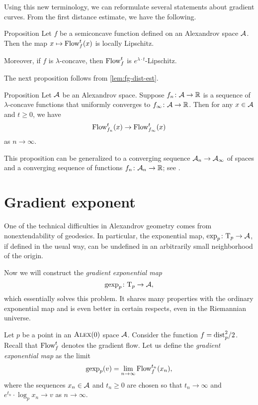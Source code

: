 Using this new terminology, we can reformulate several statements about gradient curves.
From the first distance estimate, we have the following.

\begin{thm}{Proposition}\label{prop:GF-is-lip}
Let $f$ be a semiconcave function defined on an Alexandrov space $\mathcal{A}$.
Then the map $x\mapsto\mathop{\rm Flow}\nolimits^t_f(x)$ is locally Lipschitz.

Moreover, if $f$ is $\lambda$-concave, then $\mathop{\rm Flow}\nolimits^t_f$ is $e^{\lambda\cdot t}$-Lipschitz.
\end{thm}

The next proposition follows from \ref{lem:fg-dist-est}.

\begin{thm}{Proposition}\label{grad-curve-conv}
Let $\mathcal{A}$ be an Alexandrov space.
Suppose $f_n\colon\mathcal{A}\to\mathbb{R}$ is a sequence of
$\lambda$-concave functions 
that uniformly converges to $f_\infty\colon\mathcal{A}\to \mathbb{R}$. 
Then for any $x\in \mathcal{A}$ and $t\ge 0$, we have
\[\mathop{\rm Flow}\nolimits_{f_n}^t(x)\to \mathop{\rm Flow}\nolimits_{f_\infty}^t(x)\]
as $n\to \infty$.
\end{thm}

This proposition can be generalized to a converging sequence $\mathcal{A}_n\to \mathcal{A}_\infty$ of spaces and a converging sequence of functions $f_n\colon\mathcal{A}_n\to\mathbb{R}$; see \cite[16.21]{alexander-kapovitch-petrunin2024}.

\section{Gradient exponent}\label{gexp}

One of the technical difficulties in Alexandrov geometry comes from
nonextendability of geodesics. 
In particular, the exponential map, $\exp_p\colon\mathrm{T}_p\to \mathcal{A}$, if defined in the usual way, can
be undefined in an arbitrarily small neighborhood of the origin. 

Now we will construct the \emph{gradient exponential map}
\[\operatorname{\rm gexp}\nolimits_p\colon\mathrm{T}_p\to\mathcal{A},\]
which essentially solves this problem. 
It shares many properties with the ordinary exponential map and is even better in certain respects,
even in the Riemannian universe.

Let $p$ be a point in an $\textsc{Alex}(0)$ space $\mathcal{A}$.
Consider the function $f=\mathrm{dist}_p^2/2$.
Recall that $\mathop{\rm Flow}\nolimits^t_{f}$ denotes the gradient flow.
Let us define the \textit{gradient exponential map} as the limit
\[\operatorname{\rm gexp}\nolimits_p(v)=\lim_{n\to\infty}\mathop{\rm Flow}\nolimits^{t_n}_{f}(x_n),\]
where the sequences $x_n\in \mathcal{A}$ and $t_n\ge 0$ are chosen so that $t_n\to\infty$
and $e^{t_n}\cdot\log_px_n\to v$ as $n\to\infty$.

